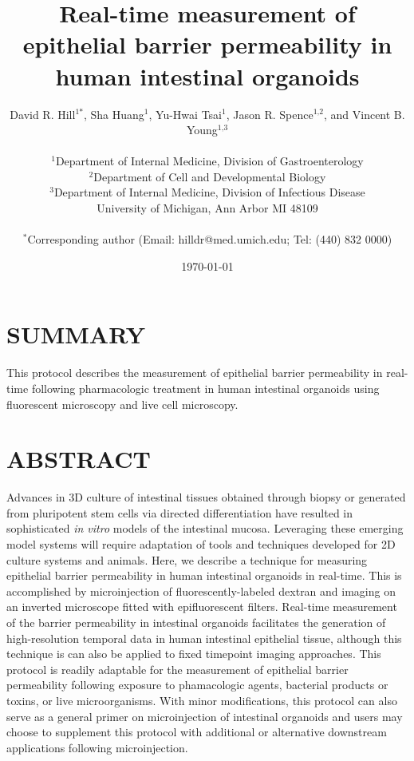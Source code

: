 \documentclass[11pt]{article}
\author{David R. Hill\(^{\text{1*}}\), Sha Huang\(^{\text{1}}\), Yu-Hwai Tsai\(^{\text{1}}\), Jason R. Spence\(^{\text{1,2}}\), and Vincent B. Young\(^{\text{1,3}}\) \\\\\(^{\text{1}}\)Department of Internal Medicine, Division of Gastroenterology\\\(^{\text{2}}\)Department of Cell and Developmental Biology\\\(^{\text{3}}\)Department of Internal Medicine, Division of Infectious Disease\\ University of Michigan, Ann Arbor MI 48109\\\\\(^{\text{*}}\)Corresponding author (Email: hilldr@med.umich.edu; Tel: (440) 832 0000)}
\date{\today}
\title{\textbf{Real-time measurement of epithelial barrier permeability in human intestinal organoids}}
\begin{document}
\maketitle
\section*{SUMMARY}
This protocol describes the measurement of epithelial barrier permeability in real-time following pharmacologic treatment in human intestinal organoids using fluorescent microscopy and live cell microscopy.\\

\section*{ABSTRACT}
Advances in 3D culture of intestinal tissues obtained through biopsy or generated from pluripotent stem cells via directed differentiation have resulted in sophisticated \emph{in vitro} models of the intestinal mucosa. Leveraging these emerging model systems will require adaptation of tools and techniques developed for 2D culture systems and animals. Here, we describe a technique for measuring epithelial barrier permeability in human intestinal organoids in real-time. This is accomplished by microinjection of fluorescently-labeled dextran and imaging on an inverted microscope fitted with epifluorescent filters. Real-time measurement of the barrier permeability in intestinal organoids facilitates the generation of high-resolution temporal data in human intestinal epithelial tissue, although this technique is can also be applied to fixed timepoint imaging approaches. This protocol is readily adaptable for the measurement of epithelial barrier permeability following exposure to phamacologic agents, bacterial products or toxins, or live microorganisms.  With minor modifications, this protocol can also serve as a general primer on microinjection of intestinal organoids and users may choose to supplement this protocol with additional or alternative downstream applications following microinjection.\\
\end{document}
